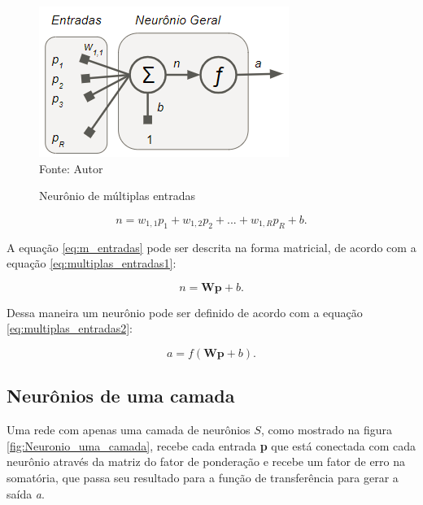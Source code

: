 \documentclass[
	12pt,				%
    oneside,			%
	a4paper,			%
	english,			%
	french,				%
	spanish,			%
	brazil,				%
	]{abntex2}
\begin{document}
\begin{figure}[H]
    \centering
    \caption{Neurônio de múltiplas entradas}
    \includegraphics[scale=1]{Neuronio_multipla_entrada1}\\
    Fonte: Autor \hfill
    \label{fig:Neuronio_multipla_entrada}
\end{figure}

  \begin{equation}
    \textit{n} = \textit{\[w_{1,1}p_1 + w_{1,2}p_2 +...+ w_{1,R}p_R + b. \]}
    \label{eq:m_entradas}
  \end{equation}
  
  A equação \ref{eq:m_entradas} pode ser descrita na forma matricial, de acordo com a equação \ref{eq:multiplas_entradas1}:
  
 \begin{equation}
    \textit{n} = \textbf{Wp} + \textit{b}.
    \label{eq:multiplas_entradas1}
  \end{equation}
  
  Dessa maneira um neurônio pode ser definido de acordo com a equação \ref{eq:multiplas_entradas2}:
  
 \begin{equation}
    \textit{a} = \textit{f}(\textbf{Wp} + \textit{b}).
    \label{eq:multiplas_entradas2}
  \end{equation} 
  
\subsection {Neurônios de uma camada} 

Uma rede com apenas uma camada de neurônios $S$, como mostrado na figura \ref{fig:Neuronio_uma_camada}, recebe cada entrada \textbf{p} que está conectada com cada neurônio através da matriz do fator de ponderação e recebe um fator de erro na somatória, que passa seu resultado para a função de transferência para gerar a saída \textit{a}.
\end{document}
